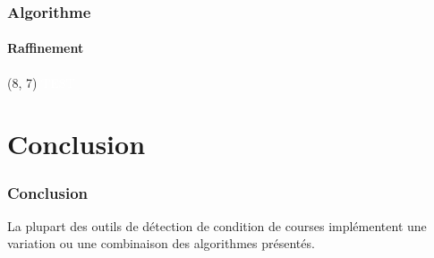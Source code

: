 \documentclass{beamer}
\begin{document}
\begin{frame}
\frametitle{Algorithme}
\framesubtitle{Raffinement}

\begin{textblock}{5}(8, 7)
	 \textcolor{white}{TEST}
\end{textblock}
\end{frame}

\section{Conclusion}
\begin{frame}
\frametitle{Conclusion}
La plupart des outils de détection de condition de courses implémentent une variation ou une combinaison des algorithmes présentés.
\end{frame}
\end{document}

